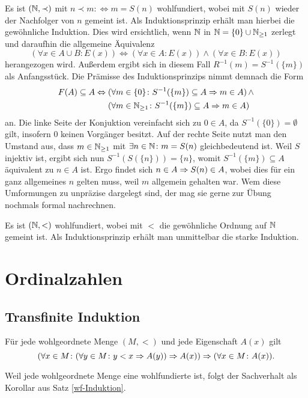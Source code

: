 Es ist $(\mathbb N,\prec)$ mit $n\prec m :\Leftrightarrow m=S(n)$ wohlfundiert,
wobei mit $S(n)$ wieder der Nachfolger von $n$ gemeint ist.
Als Induktionsprinzip erhält man hierbei die gewöhnliche Induktion.
Dies wird ersichtlich, wenn $\mathbb N$ in $\mathbb N=\{0\}\cup\mathbb N_{\ge 1}$ zerlegt
und daraufhin die allgemeine Äquivalenz
\[(\forall x\in A\cup B\colon E(x)) \Leftrightarrow
(\forall x\in A\colon E(x))\land (\forall x\in B\colon E(x))\]
herangezogen wird. Außerdem ergibt sich in diesem Fall
$R^{-1}(m) = S^{-1}(\{m\})$ als Anfangsstück. Die Prämisse des
Induktionsprinzips nimmt demnach die Form
\begin{align*}
F(A)\subseteq A \Leftrightarrow\; &(\forall m\in\{0\}\colon S^{-1}(\{m\})\subseteq A\Rightarrow m\in A)\,{\land}\\
&(\forall m\in\mathbb N_{\ge 1}\colon S^{-1}(\{m\})\subseteq A\Rightarrow m\in A)
\end{align*}
an. Die linke Seite der Konjuktion vereinfacht sich zu $0\in A$,
da $S^{-1}(\{0\})=\emptyset$ gilt, insofern $0$ keinen Vorgänger besitzt.
Auf der rechte Seite nutzt man
den Umstand aus, dass $m\in\mathbb N_{\ge 1}$ mit $\exists n\in\mathbb N\colon m=S(n)$
gleichbedeutend ist. Weil $S$ injektiv ist, ergibt sich nun
$S^{-1}(S(\{n\})) = \{n\}$, womit $S^{-1}(\{m\})\subseteq A$
äquivalent zu $n\in A$ ist. Ergo findet sich $n\in A\Rightarrow S(n)\in A$,
wobei dies für ein ganz allgemeines $n$ gelten muss, weil $m$ allgemein
gehalten war. Wem diese Umformungen zu unpräzise dargelegt sind, der mag
sie gerne zur Übung nochmals formal nachrechnen.

Es ist $(\mathbb N,<)$ wohlfundiert, wobei mit $<$ die gewöhnliche Ordnung
auf $\mathbb N$ gemeint ist. Als Induktionsprinzip erhält man unmittelbar die starke
Induktion.


\section{Ordinalzahlen}

\subsection{Transfinite Induktion}

\begin{Satz}\newlinefirst
Für jede wohlgeordnete Menge $(M,<)$ und jede Eigenschaft $A(x)$ gilt
\[(\forall x\in M\colon (\forall y\in M\colon y<x\Rightarrow A(y))\Rightarrow A(x))
\Rightarrow (\forall x\in M\colon A(x)).\]
\end{Satz}
\begin{Beweis}
Weil jede wohlgeordnete Menge eine wohlfundierte ist, folgt der
Sachverhalt als Korollar aus Satz \ref{wf-Induktion}.\,\qedsymbol
\end{Beweis}

